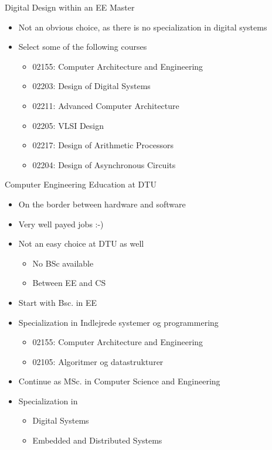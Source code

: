 \documentclass[xcolor=pdflatex,dvipsnames,table]{beamer}
\begin{document}
\begin{frame}[fragile]{Digital Design within an EE Master}
\begin{itemize}
\item Not an obvious choice, as there is no specialization in digital systems
\item Select some of the following courses
\begin{itemize}
\item 02155: Computer Architecture and Engineering
\item 02203: Design of Digital Systems
\item 02211: Advanced Computer Architecture
\item 02205: VLSI Design
\item 02217: Design of Arithmetic Processors
\item 02204: Design of Asynchronous Circuits
\end{itemize}
\end{itemize}
\end{frame}

\begin{frame}[fragile]{Computer Engineering Education at DTU}
\begin{itemize}
\item On the border between hardware and software
\item Very well payed jobs :-)
\item Not an easy choice at DTU as well
\begin{itemize}
\item No BSc available
\item Between EE and CS
\end{itemize}
\item Start with Bsc. in EE
\item Specialization in Indlejrede systemer og programmering
\begin{itemize}
\item 02155: Computer Architecture and Engineering
\item 02105: Algoritmer og datastrukturer
\end{itemize}
\item Continue as MSc. in Computer Science and Engineering
\item Specialization in
\begin{itemize}
\item Digital Systems
\item Embedded and Distributed Systems
\end{itemize}
\end{itemize}
\end{frame}
\end{document}
